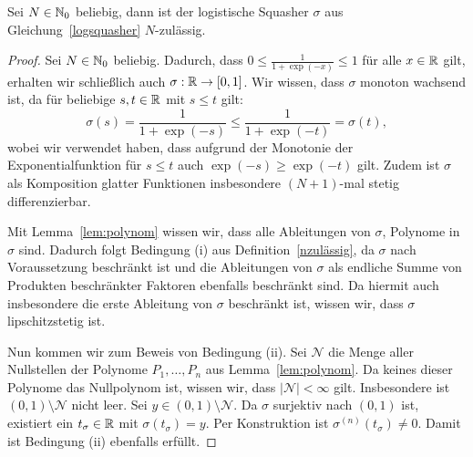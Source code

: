 \begin{lem}
\label{lem:logsquasher}
Sei $N \in \mathbb{N}_0$ beliebig, dann ist der logistische Squasher $\sigma$ aus Gleichung~\eqref{logsquasher} $N$-zulässig.
\end{lem}
\begin{proof}
Sei $N \in \mathbb{N}_0$ beliebig. Dadurch, dass $0 \leq \frac{1}{1 + \exp(-x)} \leq 1$ für alle $x \in \mathbb{R}$ gilt, erhalten wir schließlich auch $\sigma: \mathbb{R} \to [0,1]$. Wir wissen, dass $\sigma$ monoton wachsend ist, da für beliebige $s, t \in \mathbb{R}$ mit $s \leq t$ gilt:
$$\sigma(s) = \frac{1}{1 + \exp(-s)} \leq \frac{1}{1 + \exp(-t)} = \sigma(t),$$
wobei wir verwendet haben, dass aufgrund der Monotonie der Exponentialfunktion für $s \leq t$ auch $\exp(-s) \geq \exp(-t)$ gilt.
Zudem ist $\sigma$ als Komposition glatter Funktionen insbesondere $(N + 1)$-mal stetig differenzierbar.

Mit Lemma~\ref{lem:polynom} wissen wir, dass alle Ableitungen von $\sigma$, Polynome in $\sigma$ sind. Dadurch folgt Bedingung (i) aus Definition~\ref{nzulässig}, da $\sigma$ nach Voraussetzung beschränkt ist und die Ableitungen von $\sigma$ als endliche Summe von Produkten beschränkter Faktoren ebenfalls beschränkt sind. Da hiermit auch insbesondere die erste Ableitung von $\sigma$ beschränkt ist, wissen wir, dass $\sigma$ lipschitzstetig ist.

Nun kommen wir zum Beweis von Bedingung (ii).
Sei $\mathcal{N}$ die Menge aller Nullstellen der Polynome $P_1,\dots,P_n$ aus Lemma~\ref{lem:polynom}. Da keines dieser Polynome das Nullpolynom ist, wissen wir, dass $|\mathcal{N}| < \infty$ gilt. Insbesondere ist $(0,1)\setminus \mathcal{N}$ nicht leer. Sei $y \in (0,1) \setminus \mathcal{N}$. Da $\sigma$ surjektiv nach $(0,1)$ ist, existiert ein $t_{\sigma} \in \mathbb{R}$ mit $\sigma(t_{\sigma}) = y.$ Per Konstruktion ist $\sigma^{(n)}(t_{\sigma}) \neq 0.$
Damit ist Bedingung (ii) ebenfalls erfüllt.


\end{proof}
